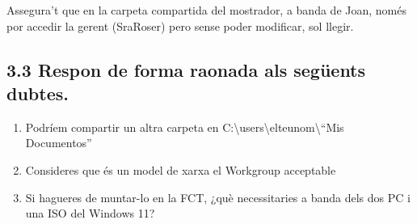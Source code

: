 \documentclass[
  a4paper,
]{article}
\providecommand{\tightlist}{%
  \setlength{\itemsep}{0pt}\setlength{\parskip}{0pt}}
\begin{document}
Assegura't que en la carpeta compartida del mostrador, a banda de Joan,
només por accedir la gerent (SraRoser) pero sense poder modificar, sol
llegir.

\subsection{3.3 Respon de forma raonada als següents
dubtes.}\label{respon-de-forma-raonada-als-seguxfcents-dubtes.}

\begin{enumerate}
\def\labelenumi{\alph{enumi}.}
\tightlist
\item
  Podríem compartir un altra carpeta en
  C:\textbackslash users\textbackslash elteunom\textbackslash{}``Mis
  Documentos''
\item
  Consideres que és un model de xarxa el Workgroup acceptable
\item
  Si hagueres de muntar-lo en la FCT, ¿què necessitaries a banda dels
  dos PC i una ISO del Windows 11?
\end{enumerate}
\end{document}
